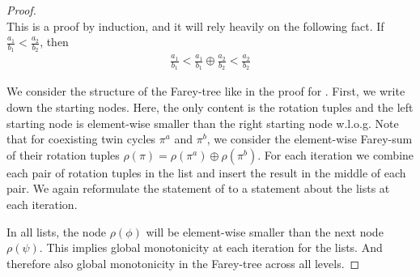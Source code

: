 \begin{proof} \phantom{x} \\
	This is a proof by induction, and it will rely heavily on the following fact.
	If $\frac{a_1}{b_1} < \frac{a_2}{b_2}$, then
	\begin{align}
		\frac{a_1}{b_1} < \frac{a_1}{b_1} \oplus \frac{a_2}{b_2} < \frac{a_2}{b_2}
	\end{align}

	We consider the structure of the Farey-tree like in the proof for .
	First, we write down the starting nodes.
	Here, the only content is the rotation tuples and the left starting node is element-wise smaller than the right starting node w.l.o.g.
	Note that for coexisting twin cycles $\pi^a$ and $\pi^b$, we consider the element-wise Farey-sum of their rotation tuples $\rho(\pi) = \rho(\pi^a) \oplus \rho(\pi^b)$.
	For each iteration we combine each pair of rotation tuples in the list and insert the result in the middle of each pair.
	We again reformulate the statement of  to a statement about the lists at each iteration.

	In all lists, the node $\rho(\phi)$ will be element-wise smaller than the next node $\rho(\psi)$.
	This implies global monotonicity at each iteration for the lists.
	And therefore also global monotonicity in the Farey-tree across all levels.


\end{proof}
